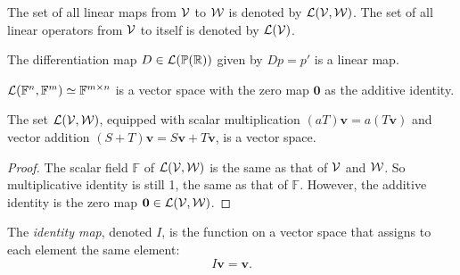 \begin{ntn}
  \label{ntn:spaceOfLinearMaps}  
  The set of all linear maps from ${\cal V}$ to ${\cal W}$
  is denoted by ${\cal L}({\cal V}, {\cal W})$.
  The set of all linear operators from ${\cal V}$ to itself
  is denoted by ${\cal L}({\cal V})$.
\end{ntn}

\begin{exm}
  \label{exm:polynomialDiffIsLinearMap}
  The differentiation map 
  $D\in {\cal L}(\mathbb{P}(\mathbb{R}))$
  given by $D p = p'$
  is a linear map. 
\end{exm}

\begin{exm}
  ${\cal L}(\mathbb{F}^n, \mathbb{F}^m)\simeq \mathbb{F}^{m\times n}$
  is a vector space with the zero map $\mathbf{0}$
  as the additive identity.
\end{exm}


\begin{lem}
  The set ${\cal L}({\cal V}, {\cal W})$,
  equipped with
  scalar multiplication
  $(aT)\mathbf{v}= a(T\mathbf{v})$
  and vector addition
  \mbox{$(S+T)\mathbf{v} = S\mathbf{v}+ T\mathbf{v}$},
  is a vector space.
\end{lem}
\begin{proof}
  The scalar field $\mathbb{F}$ of ${\cal L}({\cal V}, {\cal W})$
  is the same as that of ${\cal V}$ and ${\cal W}$.
  So multiplicative identity is still 1,
  the same as that of $\mathbb{F}$.
  However, the additive identity is the zero map
  $\mathbf{0} \in {\cal L}({\cal V}, {\cal W})$.
\end{proof}

\begin{defn}
  The \emph{identity map}, denoted $I$,
  is the function on a vector space
  that assigns to each element the same element:
  \begin{equation}
    \label{eq:identityMap}
    I\mathbf{v} = \mathbf{v}.
  \end{equation}
\end{defn}

